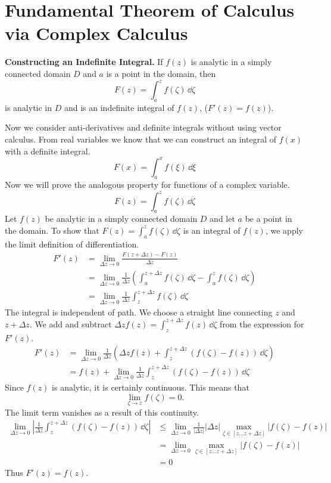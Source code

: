 \section{Fundamental Theorem of Calculus via Complex Calculus}





\begin{Result}
  \label{res_con_ind_int}
  \textbf{Constructing an Indefinite Integral.}
  If $f(z)$ is analytic in a simply connected domain $D$ and $a$ is a point
  in the domain, then
  \[
  F(z) = \int_a^z f(\zeta) \,\dd \zeta
  \]
  is analytic in $D$ and is an indefinite integral of $f(z)$, 
  ($F'(z) = f(z)$).
\end{Result}


Now we consider anti-derivatives and definite integrals without using
vector calculus.  From real variables we know that we can construct 
an integral of $f(x)$ with a definite integral.
\[
F(x) = \int_a^x f(\xi)\,\dd \xi
\]
Now we will prove the analogous property for functions of a complex variable.
\[
F(z) = \int_a^z f(\zeta)\,\dd \zeta
\]
Let $f(z)$ be analytic in a simply connected domain $D$ and let $a$ 
be a point in the domain.  
To show that $F(z) = \int_a^z f(\zeta)\,\dd \zeta$ is an integral of $f(z)$, we apply the 
limit definition of differentiation.
\begin{align*}
  F'(z)   
  &= \lim_{\Delta z \to 0} \frac{ F(z + \Delta z) - F(z) }{ \Delta z } 
  \\
  &= \lim_{\Delta z \to 0} \frac{1}{ \Delta z } \left(
    \int_a^{z + \Delta z} f(\zeta) \,\dd \zeta - \int_a^{z} f(\zeta) \,\dd \zeta \right) 
  \\
  &= \lim_{\Delta z \to 0} \frac{1}{ \Delta z } \int_z^{z + \Delta z} f(\zeta) \,\dd \zeta
\end{align*}
The integral is independent of path.  We choose a straight line connecting
$z$ and $z + \Delta z$.  
We add and subtract $\Delta z f(z) = \int_z^{z + \Delta z} f(z) \,\dd\zeta$
from the expression for $F'(z)$.
\begin{align*}
  F'(z)   &= \lim_{\Delta z \to 0} \frac{1}{ \Delta z }
  \left( \Delta z f(z) + \int_z^{z + \Delta z} (f(\zeta) - f(z)) \,\dd \zeta \right) 
  \\
  &= f(z) + \lim_{\Delta z \to 0} \frac{1}{ \Delta z } \int_z^{z + \Delta z} (f(\zeta) - f(z)) \,\dd \zeta
\end{align*}
Since $f(z)$ is analytic, it is certainly continuous.  This means that 
\[
\lim_{\zeta \to z} f(\zeta) = 0.
\]
The limit term vanishes as a result of this continuity.
\begin{align*}
  \lim_{\Delta z \to 0} \left| \frac{1}{ \Delta z } \int_z^{z + \Delta z} (f(\zeta) - f(z)) \,\dd \zeta \right|
  &\leq \lim_{\Delta z \to 0} \frac{1}{ | \Delta z | } | \Delta z | \max_{\zeta \in [z \ldots z + \Delta z]} |f(\zeta) - f(z)| 
  \\
  &= \lim_{\Delta z \to 0} \max_{\zeta \in [z \ldots z + \Delta z]} |f(\zeta) - f(z)| 
  \\
  &= 0
\end{align*}
Thus $F'(z) = f(z)$.  

